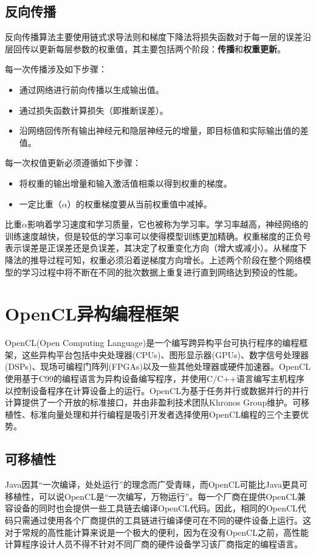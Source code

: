 \subsection{反向传播}

反向传播算法主要使用链式求导法则和梯度下降法将损失函数对于每一层的误差沿层回传以更新每层参数的权重值，其主要包括两个阶段：\textbf{传播}和\textbf{权重更新}。

每一次传播涉及如下步骤：

\begin{itemize}
  \item 通过网络进行前向传播以生成输出值。
  \item 通过损失函数计算损失（即推断误差）。
  \item 沿网络回传所有输出神经元和隐层神经元的增量，即目标值和实际输出值的差值。
\end{itemize}

每一次权值更新必须遵循如下步骤：

\begin{itemize}
  \item 将权重的输出增量和输入激活值相乘以得到权重的梯度。
  \item 一定比重（$\alpha$）的权重梯度要从当前权重值中减掉。
\end{itemize}


比重$\alpha$影响着学习速度和学习质量，它也被称为学习率。学习率越高，神经网络的训练速度越快，但是较低的学习率可以使得模型训练更加精确。权重梯度的正负号表示误差是正误差还是负误差，其决定了权重变化方向（增大或减小）。从梯度下降法的推导过程可知，权重必须沿着逆梯度方向增长。上述两个阶段在整个网络模型的学习过程中将不断在不同的批次数据上重复进行直到网络达到预设的性能。

\section{OpenCL异构编程框架}
\label{chapter:chapteropencl}
OpenCL(Open Computing Language)\cite{stone2010opencl}是一个编写跨异构平台可执行程序的编程框架，这些异构平台包括中央处理器(CPUs)、图形显示器(GPUs)、数字信号处理器(DSPs)、现场可编程门阵列(FPGAs)以及一些其他处理器或硬件加速器。OpenCL使用基于C99的编程语言为异构设备编写程序，并使用C/C++语言编写主机程序以控制设备程序在计算设备上的运行。OpenCL为基于任务并行或数据并行的并行计算提供了一个开放的标准接口，并由非盈利技术团队Khronos Group维护。可移植性、标准向量处理和并行编程是吸引开发者选择使用OpenCL编程的三个主要优势。

\subsection{可移植性}
Java因其“一次编译，处处运行”的理念而广受青睐，而OpenCL可能比Java更具可移植性，可以说OpenCL是“一次编写，万物运行”。每一个厂商在提供OpenCL兼容设备的同时也会提供一些工具链去编译OpenCL代码。因此，相同的OpenCL代码只需通过使用各个厂商提供的工具链进行编译便可在不同的硬件设备上运行。这对于常规的高性能计算来说是一个极大的便利，因为在没有OpenCL之前，高性能计算程序设计人员不得不针对不同厂商的硬件设备学习该厂商指定的编程语言。

